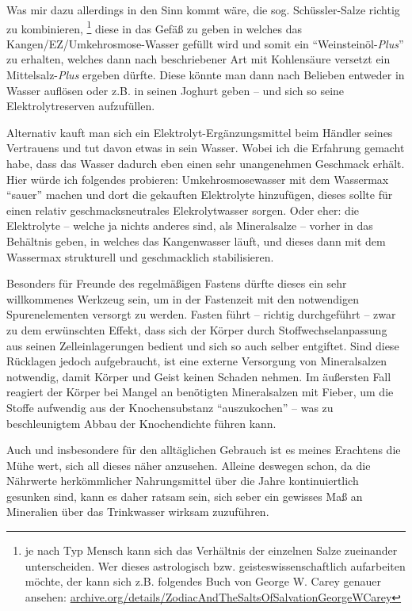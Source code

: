 \documentclass[a5paper,fontsize=10pt]{memoir}
\begin{document}
Was mir dazu allerdings in den Sinn kommt wäre, 
die sog. Schüssler-Salze richtig zu kombinieren,%
\footnote{je nach Typ Mensch kann sich das Verhältnis 
der einzelnen Salze zueinander unterscheiden. 
Wer dieses astrologisch bzw. geisteswissenschaftlich aufarbeiten möchte, 
der kann sich z.B. folgendes Buch von George W. Carey genauer ansehen: 
\href{https://archive.org/details/ZodiacAndTheSaltsOfSalvationGeorgeWCarey}{archive.org/details/ZodiacAndTheSaltsOfSalvationGeorgeWCarey}}
diese in das Gefäß zu geben
in welches das Kangen/EZ/Umkehrosmose-Wasser gefüllt wird
und somit ein ``Weinsteinöl-\emph{Plus}'' zu erhalten, 
welches dann nach beschriebener Art mit Kohlensäure versetzt 
ein Mittelsalz-\emph{Plus} ergeben dürfte. 
Diese könnte man dann nach Belieben entweder in Wasser auflösen 
oder z.B. in seinen Joghurt geben 
-- und sich so seine Elektrolytreserven aufzufüllen.

Alternativ kauft man sich ein Elektrolyt-Ergänzungsmittel 
beim Händler seines Vertrauens 
und tut davon etwas in sein Wasser. 
Wobei ich die Erfahrung gemacht habe, 
dass das Wasser dadurch eben einen sehr unangenehmen Geschmack erhält. 
Hier würde ich folgendes probieren: 
Umkehrosmosewasser mit dem Wassermax ``sauer'' machen 
und dort die gekauften Elektrolyte hinzufügen, 
dieses sollte für einen relativ geschmacksneutrales Elekrolytwasser sorgen. 
Oder eher: die Elektrolyte 
-- welche ja nichts anderes sind, als Mineralsalze 
-- vorher in das Behältnis geben, in welches das Kangenwasser läuft, 
und dieses dann mit dem Wassermax strukturell und geschmacklich stabilisieren.

Besonders für Freunde des regelmäßigen Fastens 
dürfte dieses ein sehr willkommenes Werkzeug sein, 
um in der Fastenzeit mit den notwendigen Spurenelementen versorgt zu werden. 
Fasten führt -- richtig durchgeführt -- zwar zu dem erwünschten Effekt, 
dass sich der Körper durch Stoffwechselanpassung 
aus seinen Zelleinlagerungen bedient 
und sich so auch selber entgiftet. 
Sind diese Rücklagen jedoch aufgebraucht, 
ist eine externe Versorgung von Mineralsalzen notwendig, 
damit Körper und Geist keinen Schaden nehmen. 
Im äußersten Fall reagiert der Körper 
bei Mangel an benötigten Mineralsalzen 
mit Fieber, 
um die Stoffe aufwendig aus der Knochensubstanz ``auszukochen'' 
-- was zu beschleunigtem Abbau der Knochendichte führen kann.

Auch und insbesondere für den alltäglichen Gebrauch 
ist es meines Erachtens die Mühe wert, 
sich all dieses näher anzusehen. 
Alleine deswegen schon, 
da die Nährwerte herkömmlicher Nahrungsmittel
über die Jahre kontinuiertlich gesunken sind, 
kann es daher ratsam sein, 
sich seber ein gewisses Maß an Mineralien 
über das Trinkwasser wirksam zuzuführen.
\end{document}
